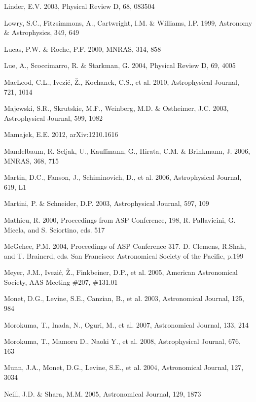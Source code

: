 \documentclass{emulateapj}
\begin{document}
\begin{thebibliography}{}
\bibitem[()]{} Linder, E.V. 2003, Physical Review D, 68, 083504
	
\bibitem[()]{} Lowry, S.C., Fitzsimmons, A., Cartwright, I.M. \& Williams, I.P. 1999, Astronomy \& 
             Astrophysics, 349, 649

\bibitem[()]{} Lucas, P.W. \& Roche, P.F. 2000, MNRAS, 314, 858
	
\bibitem[()]{} Lue, A., Scoccimarro, R. \& Starkman, G. 2004, Physical Review D, 69, 4005

\bibitem[()]{} MacLeod, C.L., Ivezi\'{c}, \v{Z}., Kochanek, C.S., et al. 2010, Astrophysical Journal, 721, 1014

\bibitem[()]{} Majewski, S.R., Skrutskie, M.F., Weinberg, M.D. \& Ostheimer, J.C. 2003, 
             Astrophysical Journal, 599, 1082

\bibitem[()]{} Mamajek, E.E. 2012, arXiv:1210.1616

\bibitem[()]{} Mandelbaum, R. Seljak, U., Kauffmann, G., Hirata, C.M. \& Brinkmann, J. 2006, MNRAS, 368, 715

\bibitem[()]{} Martin, D.C., Fanson, J., Schiminovich, D., et al. 2006, Astrophysical Journal, 619, L1

\bibitem[()]{} Martini, P. \& Schneider, D.P. 2003, Astrophysical Journal, 597, 109

\bibitem[()]{} Mathieu, R. 2000, Proceedings from ASP Conference, 198, R. Pallavicini, G. Micela, and 
             S. Sciortino, eds. 517

\bibitem[()]{} McGehee, P.M. 2004, Proceedings of ASP Conference 317. D. Clemens, R.Shah, and T. Brainerd, 
                    eds. San Francisco: Astronomical Society of the Pacific, p.199

\bibitem[()]{} Meyer, J.M., Ivezi\'{c}, \v{Z}., Finkbeiner, D.P., et al. 2005, American Astronomical 
             Society, AAS Meeting \#207, \#131.01

\bibitem[()]{} Monet, D.G., Levine, S.E., Canzian, B., et al. 2003, Astronomical Journal, 125, 984

\bibitem[()]{} Morokuma, T., Inada, N., Oguri, M., et al. 2007, Astronomical Journal, 133, 214

\bibitem[()]{} Morokuma, T., Mamoru D., Naoki Y., et al. 2008, Astrophysical Journal, 676, 163	

\bibitem[()]{} Munn, J.A., Monet, D.G., Levine, S.E., et al. 2004, Astronomical Journal, 127, 3034
	
\bibitem[()]{} Neill, J.D. \& Shara, M.M. 2005, Astronomical Journal, 129, 1873


\end{thebibliography}
\end{document}
